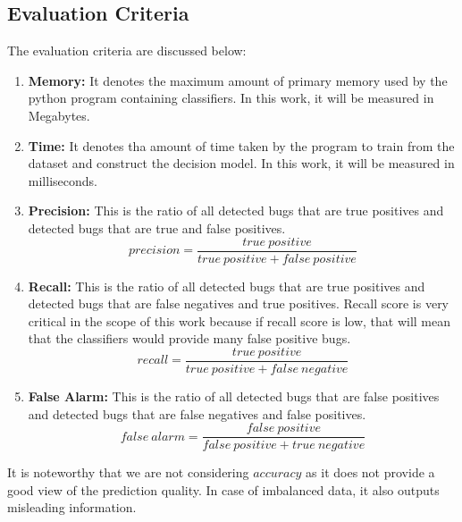 \documentclass[sigplan]{acmart}\settopmatter{printfolios=true,printccs=false,printacmref=false}
\begin{document}
\subsection{Evaluation Criteria}
The evaluation criteria are discussed below:
\begin{enumerate}
	\item \textbf{Memory: } It denotes the maximum amount of primary memory used by the python program containing classifiers. In this work, it will be measured in Megabytes.
	\item \textbf{Time: } It denotes tha amount of time taken by the program to train from the dataset and construct the decision model. In this work, it will be measured in milliseconds.
	\item \textbf{Precision: } This is the ratio of all detected bugs that are true positives and detected bugs that are true and false positives.
	\begin{equation}
	precision = \frac{true \ positive}{true\ positive + false \ positive}
	\end{equation}
	\item \textbf{Recall: } This is the ratio of all detected bugs that are true positives and detected bugs that are false negatives and true positives. Recall score is very critical in the scope of this work because if recall score is low, that will mean that the classifiers would provide many false positive bugs.
	\begin{equation}
	recall = \frac{true \ positive}{true \ positive + false \ negative}
	\end{equation}
	\item \textbf{False Alarm: } This is the ratio of all detected bugs that are false positives and detected bugs that are false negatives and false positives. 
	\begin{equation}
	false \ alarm = \frac{false \ positive}{false \ positive + true \ negative}
	\end{equation}
\end{enumerate}

It is noteworthy that we are not considering $accuracy$ as it does not provide a good view of the prediction quality. In case of imbalanced data, it also outputs misleading information.
\end{document}
